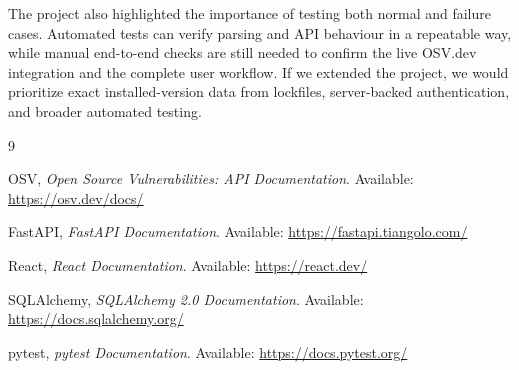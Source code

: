 \documentclass[12pt,a4paper]{report}
\begin{document}
The project also highlighted the importance of testing both normal and failure cases. Automated tests can verify parsing and API behaviour in a repeatable way, while manual end-to-end checks are still needed to confirm the live OSV.dev integration and the complete user workflow. If we extended the project, we would prioritize exact installed-version data from lockfiles, server-backed authentication, and broader automated testing.

\begin{thebibliography}{9}

OSV, \emph{Open Source Vulnerabilities: API Documentation}.
Available: \url{https://osv.dev/docs/}

FastAPI, \emph{FastAPI Documentation}.
Available: \url{https://fastapi.tiangolo.com/}

React, \emph{React Documentation}.
Available: \url{https://react.dev/}

SQLAlchemy, \emph{SQLAlchemy 2.0 Documentation}.
Available: \url{https://docs.sqlalchemy.org/}

pytest, \emph{pytest Documentation}.
Available: \url{https://docs.pytest.org/}

\end{thebibliography}
\end{document}
